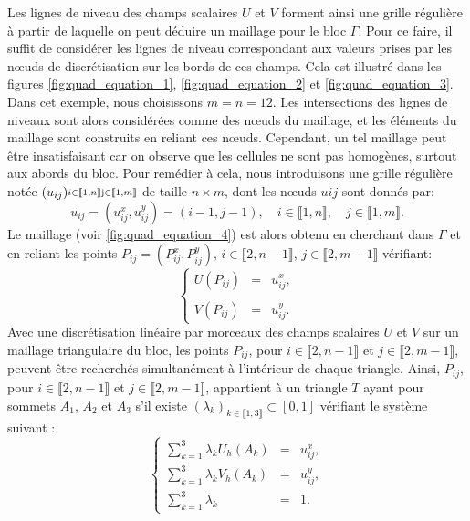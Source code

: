 Les lignes de niveau des champs scalaires $U$ et $V$ forment ainsi une grille régulière à partir de laquelle on peut déduire un maillage pour le bloc $\Gamma$. Pour ce faire, il suffit de considérer les lignes de niveau correspondant aux valeurs prises par les nœuds de discrétisation sur les bords de ces champs. Cela est illustré dans les figures \ref{fig:quad_equation_1}, \ref{fig:quad_equation_2} et \ref{fig:quad_equation_3}. Dans cet exemple, nous choisissons $m=n=12$. Les intersections des lignes de niveaux sont alors considérées comme des nœuds du maillage, et les éléments du maillage sont construits en reliant ces nœuds. Cependant, un tel maillage peut être insatisfaisant car on observe que les cellules ne sont pas homogènes, surtout aux abords du bloc. Pour remédier à cela, nous introduisons une grille régulière notée $(u_{ij}){\substack{i\in\llbracket 1, n\rrbracket{\text{j}}\in\llbracket 1, m\rrbracket}}$ de taille $n\times m$, dont les nœuds $u{ij}$ sont donnés par:
\begin{equation}
u_{ij}=(u_{ij}^x, u_{ij}^y)=(i-1, j-1),\quad i\in\llbracket 1, n\rrbracket,\quad j\in\llbracket 1, m\rrbracket.
\end{equation}
Le maillage (voir \ref{fig:quad_equation_4}) est alors obtenu en cherchant dans $\Gamma$ et en reliant les points $P_{ij}=(P_{ij}^x, P_{ij}^y)$, $i\in\llbracket 2, n-1\rrbracket$, $j\in\llbracket 2, m-1\rrbracket$ vérifiant:
\begin{equation}
\left\{
\begin{array}{lcl}
U(P_{ij})&=&u_{ij}^x,\\\\
V(P_{ij})&=&u_{ij}^y.
\end{array}
\right.
\end{equation}
Avec une discrétisation linéaire par morceaux des champs scalaires $U$ et $V$ sur un maillage triangulaire du bloc, les points $P_{ij}$, pour $i \in \llbracket 2, n-1 \rrbracket$ et $j \in \llbracket 2, m-1 \rrbracket$, peuvent être recherchés simultanément à l'intérieur de chaque triangle. Ainsi, $P_{ij}$, pour $i \in \llbracket 2, n-1 \rrbracket$ et $j \in \llbracket 2, m-1 \rrbracket$, appartient à un triangle $T$ ayant pour sommets $A_1$, $A_2$ et $A_3$ s'il existe $(\lambda_k)_{k \in \llbracket 1, 3 \rrbracket} \subset [0, 1]$ vérifiant le système suivant :
\begin{equation}
\left\{
\begin{array}{lcl}
\displaystyle\sum_{k=1}^3\lambda_k U_h(A_k) & = & u_{ij}^x,\\
\displaystyle\sum_{k=1}^3\lambda_k V_h(A_k) & = & u_{ij}^y,\\
\displaystyle\sum_{k=1}^3\lambda_k & = & 1.
\end{array}
\right.
\end{equation}
